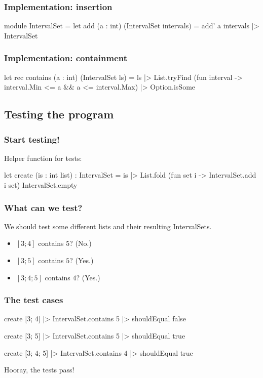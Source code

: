 \documentclass{beamer}
\begin{document}
\begin{frame}[fragile]
\frametitle{Implementation: insertion}
\begin{fslisting}
[<RequireQualifiedAccess>]
module IntervalSet =
    let add (a : int) (IntervalSet intervals) =
        add' a intervals
        |> IntervalSet
\end{fslisting}
\end{frame}

\begin{frame}[fragile]
\frametitle{Implementation: containment}

\begin{fslisting}
let rec contains (a : int) (IntervalSet ls) =
    ls
    |> List.tryFind (fun interval ->
        interval.Min <= a && a <= interval.Max)
    |> Option.isSome
\end{fslisting}
\end{frame}

\subsection{Testing the program}

\begin{frame}[fragile]
\frametitle{Start testing!}
Helper function for tests:
\begin{fslisting}
let create (is : int list) : IntervalSet =
    is
    |> List.fold
        (fun set i -> IntervalSet.add i set)
        IntervalSet.empty
\end{fslisting}
\end{frame}
\begin{frame}
\frametitle{What can we test?}
We should test some different lists and their resulting IntervalSets.

\begin{itemize}
    \item $[3; 4]$ contains $5$? (No.)
    \item $[3; 5]$ contains $5$? (Yes.)
    \item $[3; 4; 5]$ contains $4$? (Yes.)
\end{itemize}
\end{frame}

\begin{frame}[fragile]
\frametitle{The test cases}
\begin{fslisting}
    create [3; 4]
    |> IntervalSet.contains 5
    |> shouldEqual false

    create [3; 5]
    |> IntervalSet.contains 5
    |> shouldEqual true

    create [3; 4; 5]
    |> IntervalSet.contains 4
    |> shouldEqual true
\end{fslisting}
\pause
Hooray, the tests pass!
\end{frame}
\end{document}
